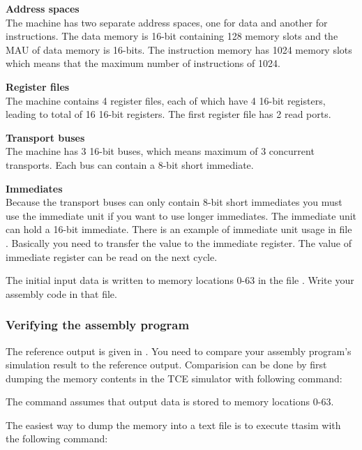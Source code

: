 \documentclass[twoside]{tceusermanual}
\begin{document}
\textbf{Address spaces} \\
The machine has two separate address spaces, one for data and another for
instructions. The data memory is 16-bit containing 128 memory slots and the
MAU of data memory is 16-bits. The instruction memory has 1024 memory slots
which means that the maximum number of instructions of 1024.

\textbf{Register files} \\
The machine contains 4 register files, each of which have 4 16-bit registers,
leading to total of 16 16-bit registers.  The first register file
has 2 read ports.

\textbf{Transport buses} \\
The machine has 3 16-bit buses, which means maximum of 3 concurrent
transports. Each bus can contain a 8-bit short immediate.

\textbf{Immediates} \\
Because the transport buses can only contain 8-bit short immediates you must
use the immediate unit if you want to use longer immediates. The immediate unit
can hold a 16-bit immediate. There is an example of immediate unit usage in
file . Basically you need to transfer the value to the
immediate register. The value of immediate register can be read on the next
cycle.

The initial input data is written to memory locations 0-63 in the file
. Write your assembly code in that file.

\subsubsection{Verifying the assembly program}

The reference output is given in . You need to
compare your assembly program's simulation result to the reference
output. Comparision can be done by first dumping the memory contents in the
TCE simulator with following command:


The command assumes that output data is stored to memory locations 0-63.

The easiest way to dump the memory into a text file is to execute ttasim with
the following command:

\end{document}
